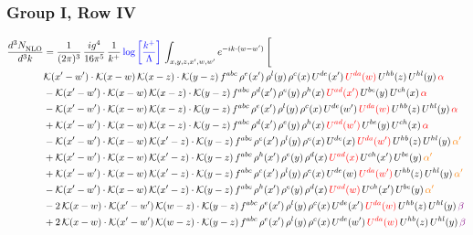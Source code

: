 \documentclass[9pt]{article}
\numberwithin{equation}{section}
\begin{document}
\subsubsection{Group I, Row IV}
\begin{align}
    \frac{d^{3}N_{\rm NLO}^{\rm}}{d^{3}k}  & = \frac{1}{(2\pi)^{3}}\, \frac{ig^{4}}{16\pi^{5}}\, \frac{1}{k^{+}}\, {\color{blue}\log{\left[\frac{k^{+}}{\Lambda}\right]}}\, \int_{x,y,z,x^{\prime},w,w^{\prime}}e^{-ik\cdot (w-w')}\, \Bigg[\notag \\ & \mathcal{K}(x'-w')\cdot \mathcal{K}(x-w)\,\mathcal{K}(x-z)\cdot \mathcal{K}(y-z)\,f^{abc}\, \rho^{e}(x')\, \rho^{l}(y)\,\rho^{c}(x)\, U^{de}(x')\,{\color{red}U^{da}(w)}\,U^{hb}(z)\,U^{hl}(y)\, {\color{red}\alpha}\notag \\ & -\mathcal{K}(x'-w')\cdot \mathcal{K}(x-w)\,\mathcal{K}(x-z)\cdot \mathcal{K}(y-z)\,f^{abc}\, \rho^{d}(x')\, \rho^{e}(y)\,\rho^{h}(x)\, {\color{red}U^{ad}(x')}\,U^{be}(y)\,U^{ch}(x)\,{\color{red} \alpha}\notag \\ & -\mathcal{K}(x'-w')\cdot \mathcal{K}(x-w)\,\mathcal{K}(x-z)\cdot \mathcal{K}(y-z)\,f^{abc}\, \rho^{e}(x')\, \rho^{l}(y)\,\rho^{c}(x)\, U^{de}(w')\,{\color{red}U^{da}(w)}\,U^{hb}(z)\,U^{hl}(y)\,{\color{red} \alpha}\notag\\ & +\mathcal{K}(x'-w')\cdot \mathcal{K}(x-w)\,\mathcal{K}(x-z)\cdot \mathcal{K}(y-z)\,f^{abc}\, \rho^{d}(x')\, \rho^{e}(y)\,\rho^{h}(x)\, {\color{red}U^{ad}(w')}\,U^{be}(y)\,U^{ch}(x)\,{\color{red} \alpha}\notag\\ &-\mathcal{K}(x'-w')\cdot\mathcal{K}(x-w)\,\mathcal{K}(x'-z)\cdot\mathcal{K}(y-z)\, f^{abc}\,\rho^{c}(x')\,\rho^{l}(y)\,\rho^{e}(x)\,U^{de}(x)\,{\color{red}U^{da}(w')}\,U^{hb}(z)\,U^{hl}(y)\,{\color{orange} \alpha'}\notag\\ & +\mathcal{K}(x'-w')\cdot\mathcal{K}(x-w)\,\mathcal{K}(x'-z)\cdot\mathcal{K}(y-z)\, f^{abc}\,\rho^{h}(x')\,\rho^{e}(y)\,\rho^{d}(x)\,{\color{red}U^{ad}(x)}\,U^{ch}(x')\,U^{be}(y)\,{\color{orange} \alpha'}\notag\\
&+\mathcal{K}(x'-w')\cdot\mathcal{K}(x-w)\,\mathcal{K}(x'-z)\cdot\mathcal{K}(y-z)\, f^{abc}\,\rho^{c}(x')\,\rho^{l}(y)\,\rho^{e}(x)\,U^{de}(w)\,{\color{red}U^{da}(w')}\,U^{hb}(z)\,U^{hl}(y)\,{\color{orange} \alpha'}\notag \\ &-\mathcal{K}(x'-w')\cdot\mathcal{K}(x-w)\,\mathcal{K}(x'-z)\cdot\mathcal{K}(y-z)\, f^{abc}\,\rho^{h}(x')\,\rho^{e}(y)\,\rho^{d}(x)\,{\color{red}U^{ad}(w)}\,U^{ch}(x')\,U^{be}(y)\,{\color{orange} \alpha'}\notag \\ &  -2\,\mathcal{K}(x-w)\cdot \mathcal{K}(x'-w')\, \mathcal{K}(w-z)\cdot \mathcal{K}(y-z)\, f^{abc}\,\rho^{e}(x')\,\rho^{l}(y)\,\rho^{c}(x)\, U^{de}(x')\,{\color{red}U^{da}(w)}\,U^{hb}(z)\,U^{hl}(y)\,{\color{violet} \beta}\notag\\ & +2\,\mathcal{K}(x-w)\cdot \mathcal{K}(x'-w')\, \mathcal{K}(w-z)\cdot \mathcal{K}(y-z)\, f^{abc}\,\rho^{e}(x')\,\rho^{l}(y)\,\rho^{c}(x)\, U^{de}(w')\,{\color{red}U^{da}(w)}\,U^{hb}(z)\,U^{hl}(y)\,{\color{violet} \beta}\notag\\

\end{align}
\end{document}

